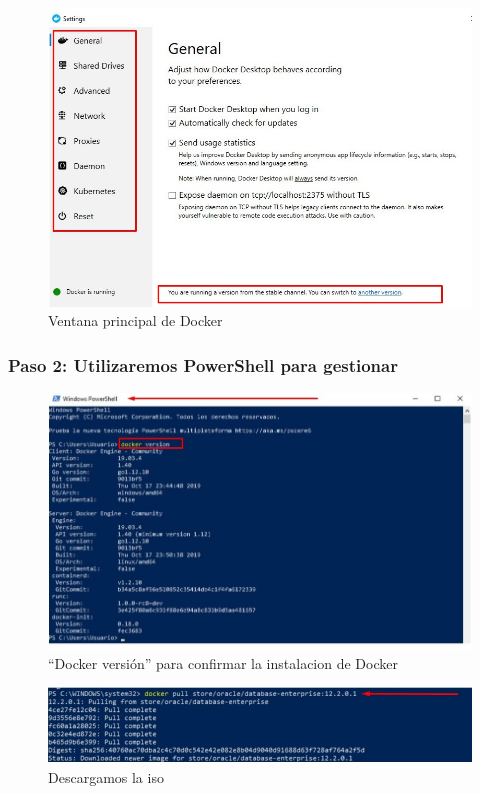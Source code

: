 \documentclass[preprint,12pt]{elsarticle}
\begin{document}
\begin{figure}[H]
	\begin{center}
		\includegraphics[width=12cm]{./IMAGENES/foto4} 
		\caption{Ventana principal de Docker}
	\end{center}
\end{figure}

\subsubsection{\textbf{Paso 2: Utilizaremos PowerShell para gestionar}}

\begin{figure}[H]
	\begin{center}
		\includegraphics[width=12cm]{./IMAGENES/foto5} 
		\caption{“Docker versión” para confirmar la instalacion de Docker}
	\end{center}
\end{figure}


\begin{figure}[H]
	\begin{center}
		\includegraphics[width=12cm]{./IMAGENES/foto6} 
		\caption{Descargamos la iso}
	\end{center}
\end{figure}
\end{document}

